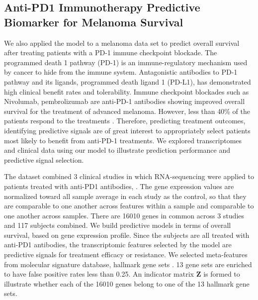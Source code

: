 \subsection{Anti-PD1 Immunotherapy Predictive Biomarker for Melanoma Survival}
We also applied the model to a melanoma data set to predict overall survival after treating patients with a PD-1 immune checkpoint blockade. The programmed death 1 pathway (PD-1) is an immune-regulatory mechanism used by cancer to hide from the immune system. Antagonistic antibodies to PD-1 pathway and its ligands, programmed death ligand 1 (PD-L1), has demonstrated high clinical benefit rates and tolerability. Immune checkpoint blockades such as Nivolumab, pembrolizumab are anti-PD-1 antibodies showing improved overall survival for the treatment of advanced melanoma. However, less than 40\% of the patients respond to the treatments \citep{moreno2015anti}. Therefore, predicting treatment outcomes, identifying predictive signals are of great interest to appropriately select patients most likely to benefit from anti-PD-1 treatments. We explored transcriptomes and clinical data using our model to illustrate prediction performance and predictive signal selection.

The dataset combined 3 clinical studies in which RNA-sequencing were applied to patients treated with anti-PD1 antibodies, \cite{gide2019distinct, riaz2017tumor, hugo2016genomic}. The gene expression values are normalized toward all sample average in each study as the control, so that they are comparable to one another across features within a sample and comparable to one another across samples. There are 16010 genes in common across 3 studies and 117 subjects combined. We build predictive models in terms of overall survival, based on gene expression profile. Since the subjects are all treated with anti-PD1 antibodies, the transcriptomic features selected by the model are predictive signals for treatment efficacy or resistance. We selected meta-features from molecular signature database, hallmark gene sets \citep{liberzon2015molecular}. 13 gene sets are enriched to have false positive rates less than 0.25. An indicator matrix $\bm{Z}$ is formed to illustrate whether each of the 16010 genes belong to one of the 13 hallmark gene sets.

